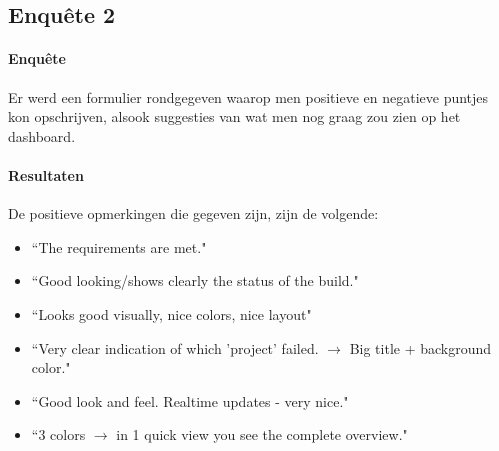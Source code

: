 \documentclass[10pt,a4paper]{article}
\begin{document}
\begin{appendices}
\clearpage

\section{Enqu\^ete 2}
\label{enquete2}
\paragraph{Enqu\^ete}
Er werd een formulier rondgegeven waarop men positieve en negatieve puntjes kon opschrijven, alsook suggesties van wat men nog graag zou zien op het dashboard.

\paragraph{Resultaten}
De positieve opmerkingen die gegeven zijn, zijn de volgende:
\begin{itemize}
\item ``The requirements are met."
\item ``Good looking/shows clearly the status of the build."
\item ``Looks good visually, nice colors, nice layout"
\item ``Very clear indication of which 'project' failed. $\rightarrow$ Big title + background color."
\item ``Good look and feel. Realtime updates - very nice."
\item ``3 colors $\rightarrow$ in 1 quick view you see the complete overview."
\end{itemize}


\end{appendices}
\end{document}

